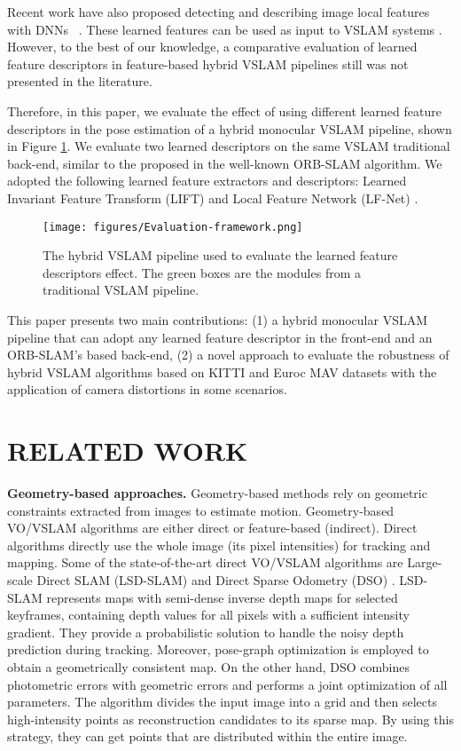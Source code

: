 \documentclass[a4paper, 10pt, conference]{ieeeconf}      %
\begin{document}
Recent work have also proposed detecting and describing image local features with DNNs ~\cite{lift, lf-net, superpoint}.  These learned features can be used as input to VSLAM systems \cite{self-improving-vo, gcnv2}. However, to the best of our knowledge, a comparative evaluation of learned feature descriptors in feature-based hybrid VSLAM pipelines still was not presented in the literature.

Therefore, in this paper, we evaluate the effect of using different learned feature descriptors in the pose estimation of a hybrid monocular VSLAM pipeline, shown in Figure \ref{fig:evaluation-pipeline}. We evaluate two learned descriptors on the same VSLAM traditional back-end, similar to the proposed in the well-known ORB-SLAM \cite{orb-slam} algorithm. We adopted the following learned feature extractors and descriptors: Learned Invariant Feature Transform (LIFT) \cite{lift} and Local Feature Network (LF-Net) \cite{lf-net}. 

\begin{figure}[t]
      \centering
      \texttt{[image: figures/Evaluation-framework.png]}
      \caption{The hybrid VSLAM pipeline used to evaluate the learned feature descriptors effect. The green boxes are the modules from a traditional VSLAM pipeline.}
      \label{fig:evaluation-pipeline}
\end{figure}

This paper presents two main contributions: (1) a hybrid monocular VSLAM pipeline that can adopt any learned feature descriptor in the front-end and an ORB-SLAM's based back-end, (2) a novel approach to evaluate the robustness of hybrid VSLAM algorithms based on KITTI \cite{kitti-dataset} and Euroc MAV \cite{euroc-mav} datasets with the application of camera distortions in some scenarios.

\section{RELATED WORK}
\label{sec:related-work}

\textbf{Geometry-based approaches.}
Geometry-based methods rely on geometric constraints extracted from images to estimate motion. Geometry-based VO/VSLAM algorithms are either direct or feature-based (indirect). Direct algorithms directly use the whole image (its pixel intensities) for tracking and mapping. Some of the state-of-the-art direct VO/VSLAM algorithms are Large-scale Direct SLAM (LSD-SLAM) \cite{lsd-slam} and Direct Sparse Odometry (DSO) \cite{dso}. LSD-SLAM represents maps with semi-dense inverse depth maps for selected keyframes, containing depth values for all pixels with a sufficient intensity gradient. They provide a probabilistic solution to handle the noisy depth prediction during tracking.
Moreover, pose-graph optimization is employed to obtain a geometrically consistent map. On the other hand, DSO combines photometric errors with geometric errors and performs a joint optimization of all parameters. The algorithm divides the input image into a grid and then selects high-intensity points as reconstruction candidates to its sparse map. By using this strategy, they can get points that are distributed within the entire image.
\end{document}
